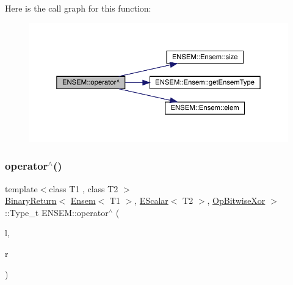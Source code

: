 Here is the call graph for this function\+:\nopagebreak
\begin{figure}[H]
\begin{center}
\leavevmode
\includegraphics[width=350pt]{d1/d9e/group__eensem_gac8825f09186c8e0f8550839946bf2d37_cgraph}
\end{center}
\end{figure}
\mbox{\label{group__eensem_ga6558c3ffb3c2fcd52505cddbc3c0b310}} 
\subsubsection{\texorpdfstring{operator$^\wedge$()}{operator^()}\hspace{0.1cm}{\footnotesize\ttfamily [2/3]}}
{\footnotesize\ttfamily template$<$class T1 , class T2 $>$ \\
\mbox{\hyperlink{structENSEM_1_1BinaryReturn}{Binary\+Return}}$<$ \mbox{\hyperlink{classENSEM_1_1Ensem}{Ensem}}$<$ T1 $>$, \mbox{\hyperlink{classENSEM_1_1EScalar}{E\+Scalar}}$<$ T2 $>$, \mbox{\hyperlink{structENSEM_1_1OpBitwiseXor}{Op\+Bitwise\+Xor}} $>$\+::Type\+\_\+t E\+N\+S\+E\+M\+::operator$^\wedge$ (\begin{DoxyParamCaption}\item[{const \mbox{\hyperlink{classENSEM_1_1Ensem}{Ensem}}$<$ T1 $>$ \&}]{l,  }\item[{const \mbox{\hyperlink{classENSEM_1_1EScalar}{E\+Scalar}}$<$ T2 $>$ \&}]{r }\end{DoxyParamCaption})\hspace{0.3cm}{\ttfamily [inline]}}

